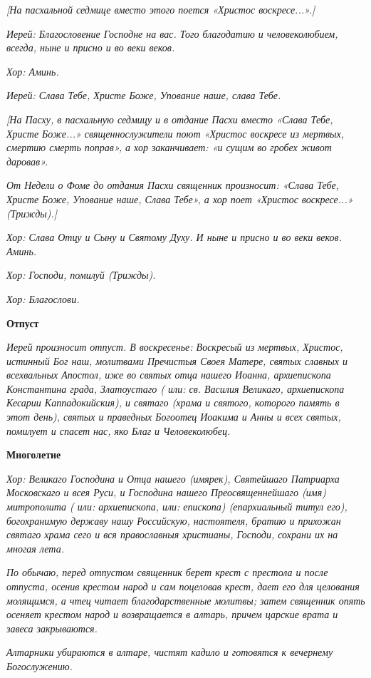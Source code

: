 \itshape [На пасхальной седмице вместо этого поется «Христос воскресе...».]\normalfont{}


\itshape Иерей:\normalfont{} Благословение Господне на вас. Того благодатию и человеколюбием, всегда, ныне и присно и во веки веков.


\itshape Хор:\normalfont{} Аминь.


\itshape Иерей:\normalfont{} Слава Тебе, Христе Боже, Упование наше, слава Тебе.


\itshape [На Пасху, в пасхальную седмицу и в отдание Пасхи вместо «Слава Тебе, Христе Боже...» священнослужители поют «Христос воскресе из мертвых, смертию смерть поправ», а хор заканчивает: «и сущим во гробех живот даровав».\normalfont{}


\itshape От Недели о Фоме до отдания Пасхи священник произносит: «Слава Тебе, Христе Боже, Упование наше, Слава Тебе», а хор поет «Христос воскресе...» (Трижды).]\normalfont{}


\itshape Хор:\normalfont{} Слава Отцу и Сыну и Святому Духу. И ныне и присно и во веки веков. Аминь.


\itshape Хор:\normalfont{} Господи, помилуй \itshape (Трижды).\normalfont{}


\itshape Хор:\normalfont{} Благослови.





\bfseries  Отпуст\normalfont{}


\itshape Иерей произносит отпуст. В воскресенье:\normalfont{} Воскресый из мертвых, Христос, истинный Бог наш, молитвами Пречистыя Своея Матере, святых славных и всехвальных Апостол, иже во святых отца нашего Иоанна, архиепископа Константина града, Златоустаго ( \itshape или:\normalfont{} св. Василия Великаго, архиепископа Кесарии Каппадокийския), и святаго \itshape (храма и святого, которого память в этот день),\normalfont{} святых и праведных Богоотец Иоакима и Анны и всех святых, помилует и спасет нас, яко Благ и Человеколюбец.





\bfseries  Многолетие\normalfont{}


\itshape Хор:\normalfont{} Великаго Господина и Отца нашего \itshape (имярек)\normalfont{}, Святейшаго Патриарха Московскаго и всея Руси, и Господина нашего Преосвященнейшаго \itshape (имя)\normalfont{} митрополита ( \itshape или:\normalfont{} архиепископа, \itshape или:\normalfont{} епископа) \itshape (епархиальный титул его),\normalfont{} богохранимую державу нашу Российскую, настоятеля, братию и прихожан святаго храма сего и вся православныя христианы, Господи, сохрани их на многая лета.


\itshape По обычаю, перед отпустом священник берет крест с престола и после отпуста, осенив крестом народ и сам поцеловав крест, дает его для целования молящимся, а чтец читает благодарственные молитвы; затем священник опять осеняет крестом народ и возвращается в алтарь, причем царские врата и завеса закрываются.\normalfont{}


\itshape Алтарники убираются в алтаре, чистят кадило и готовятся к вечернему Богослужению.\normalfont{}

\mychapterending